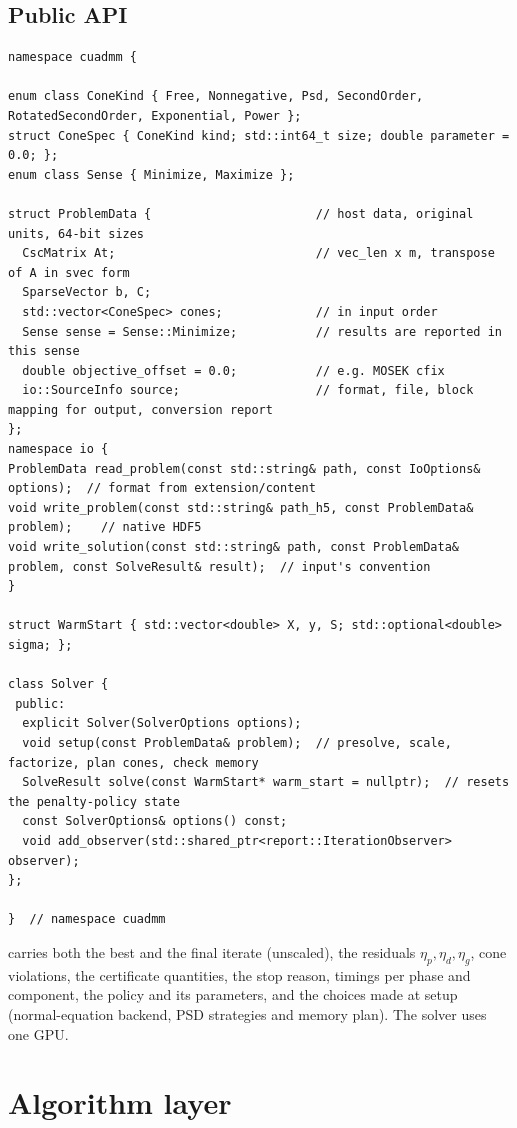 \documentclass[11pt]{article}
\begin{document}
\subsection{Public API}
\begin{lstlisting}
namespace cuadmm {

enum class ConeKind { Free, Nonnegative, Psd, SecondOrder, RotatedSecondOrder, Exponential, Power };
struct ConeSpec { ConeKind kind; std::int64_t size; double parameter = 0.0; };
enum class Sense { Minimize, Maximize };

struct ProblemData {                       // host data, original units, 64-bit sizes
  CscMatrix At;                            // vec_len x m, transpose of A in svec form
  SparseVector b, C;
  std::vector<ConeSpec> cones;             // in input order
  Sense sense = Sense::Minimize;           // results are reported in this sense
  double objective_offset = 0.0;           // e.g. MOSEK cfix
  io::SourceInfo source;                   // format, file, block mapping for output, conversion report
};
namespace io {
ProblemData read_problem(const std::string& path, const IoOptions& options);  // format from extension/content
void write_problem(const std::string& path_h5, const ProblemData& problem);    // native HDF5
void write_solution(const std::string& path, const ProblemData& problem, const SolveResult& result);  // input's convention
}

struct WarmStart { std::vector<double> X, y, S; std::optional<double> sigma; };

class Solver {
 public:
  explicit Solver(SolverOptions options);
  void setup(const ProblemData& problem);  // presolve, scale, factorize, plan cones, check memory
  SolveResult solve(const WarmStart* warm_start = nullptr);  // resets the penalty-policy state
  const SolverOptions& options() const;
  void add_observer(std::shared_ptr<report::IterationObserver> observer);
};

}  // namespace cuadmm
\end{lstlisting}
 carries both the best and the final iterate (unscaled), the residuals
$\eta_p,\eta_d,\eta_g$, cone violations, the certificate quantities, the stop reason, timings per phase and
component, the policy and its parameters, and the choices made at setup (normal-equation backend, PSD
strategies and memory plan). The solver uses one GPU.

\section{Algorithm layer}\label{sec:algorithm}
\end{document}
